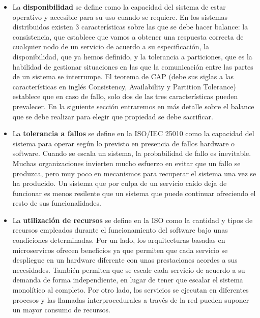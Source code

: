 \documentclass[11pt,spanish,listoffigures]{tfgetsinf}
\begin{document}
\begin{itemize}

\item La \textbf{disponibilidad} se define como la capacidad del sistema de estar operativo y accesible para su uso cuando se requiere. \cite{Standard2010} En los sistemas distribuidos existen 3 características sobre las que se debe hacer balance: la consistencia, que establece que vamos a obtener una respuesta correcta de cualquier nodo de un servicio de acuerdo a su especificación, la disponibilidad, que ya hemos definido, y la tolerancia a particiones, que es la habilidad de gestionar situaciones en las que la comunicación entre las partes de un sistema se interrumpe. El teorema de CAP (debe sus siglas a las características en inglés Consistency, Availability y Partition Tolerance) establece que en caso de fallo, solo dos de las tres características pueden prevalecer. \cite{Gilbert2012} En la siguiente sección entraremos en más detalle sobre el balance que se debe realizar para elegir que propiedad se debe sacrificar.

\item La \textbf{tolerancia a fallos} se define en la ISO/IEC 25010 como la capacidad del sistema para operar según lo previsto en presencia de fallos hardware o software. \cite{Standard2010} Cuando se escala un sistema, la probabilidad de fallo es inevitable. Muchas organizaciones invierten mucho esfuerzo en evitar que un fallo se produzca, pero muy poco en mecanismos para recuperar el sistema una vez se ha producido. Un sistema que por culpa de un servicio caído deja de funcionar es menos resilente que un sistema que puede continuar ofreciendo el resto de sus funcionalidades.

\item La \textbf{utilización de recursos} se define en la ISO como la cantidad y tipos de recursos empleados durante el funcionamiento del software bajo unas condiciones determinadas. \cite{Standard2010} Por un lado, los arquitecturas basadas en microservicos ofrecen beneficios ya que permiten que cada servicio se despliegue en un hardware diferente con unas prestaciones acordes a sus necesidades. También permiten que se escale cada servicio de acuerdo a su demanda de forma independiente, en lugar de tener que escalar el sistema monolítico al completo. \cite{DelaTorre2018} Por otro lado, los servicios se ejecutan en diferentes procesos y las llamadas interprocedurales a través de la red pueden suponer un mayor consumo de recursos. \cite{FowlerSusan}


\end{itemize}
\end{document}
